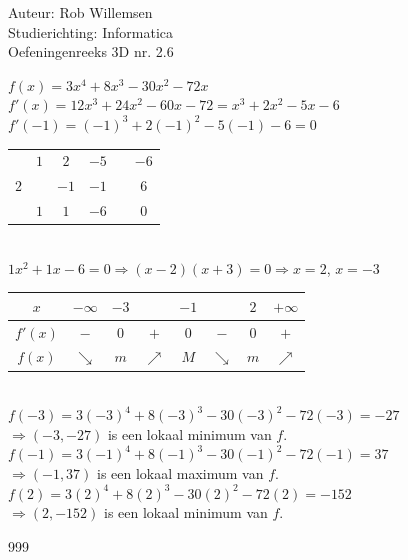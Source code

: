 \documentclass[a4paper]{article}
\begin{document}
\noindent \large Auteur: Rob Willemsen \\
\noindent \large Studierichting: Informatica \\
\noindent \large Oefeningenreeks 3D nr. 2.6 \\

\medskip

\normalsize

$f(x) = 3x^4 + 8x^3 - 30x^2 - 72x$ \\

$f'(x) = 12x^3 + 24x^2 - 60x - 72 = x^3 + 2x^2 - 5x - 6$ \\

$f'(-1) = (-1)^3 + 2(-1)^2 - 5(-1) - 6 = 0$ \\

\begin{tabular}{c|ccccc}
	& $1$ & $2$ & $-5$ &  &$-6$ \\ 
$2$ & 	  & $-1$ & $-1$ & & $6$ \\ \hline
	& $1$ & $1$ & $-6$ 	& \vline & $0$ 
\end{tabular} \\

$1x^2 + 1x - 6 = 0 \Rightarrow (x-2)(x+3) = 0 \Rightarrow x = 2$, $x = -3$ \\

\begin{tabular}{c|ccccccc}
$x$ & $-\infty$ & $-3$ & & $-1$ & & $2$ & $+\infty$\\ \hline
$f'(x)$ & $-$ & $0$ & $+$ & $0$ & $-$ & $0$ & $+$ \\
$f(x)$ & $\searrow$ & $m$ & $\nearrow$ & $M$ & $\searrow$ & $m$ & $\nearrow$ 
\end{tabular} \\

$f(-3) = 3(-3)^4 + 8(-3)^3 - 30(-3)^2 - 72(-3) = -27$\\

$\Rightarrow (-3 , -27)$ is een lokaal minimum van $f$. \\

$f(-1) = 3(-1)^4 + 8(-1)^3 - 30(-1)^2 - 72(-1) = 37$\\

$\Rightarrow (-1 , 37)$ is een lokaal maximum van $f$. \\

$f(2) = 3(2)^4 + 8(2)^3 - 30(2)^2 - 72(2) = -152$\\

$\Rightarrow (2 , -152)$ is een lokaal minimum van $f$. \\

\begin{thebibliography}{999}
\end{thebibliography}
\end{document}
